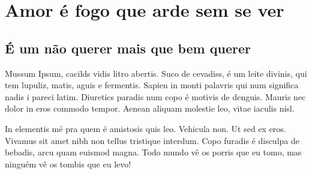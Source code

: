 
\setcounter{secnumdepth}{0}		%
\setcounter{tocdepth}{2}

\tableofcontents


\part{Amor é fogo que arde sem se ver}

\chapter{É um não querer mais que bem querer}

Mussum Ipsum, cacilds vidis litro abertis. Suco de cevadiss, é um leite
divinis, qui tem lupuliz, matis, aguis e fermentis. Sapien in monti palavris
qui num significa nadis i pareci latim.  Diuretics paradis num copo é motivis
de denguis. Mauris nec dolor in eros commodo tempor. Aenean aliquam molestie
leo, vitae iaculis nisl.

In elementis mé pra quem é amistosis quis leo. Vehicula non. Ut sed ex eros.
Vivamus sit amet nibh non tellus tristique interdum. Copo furadis é disculpa de
bebadis, arcu quam euismod magna. Todo mundo vê os porris que eu tomo, mas
ninguém vê os tombis que eu levo!


